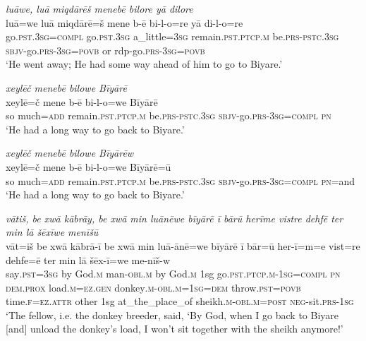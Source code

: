\ea \label{HB.64}
\textit{luāwe, luā miqdārēš menebē bilore yā dilore} \\ 
\gll luā=we luā miqdārē=š mene b-ē bi-l-o=re yā di-l-o=re \\ 
 go\textsc{.pst}\textsc{.3sg}\textsc{=\textsc{compl}} go\textsc{.pst}\textsc{.3sg} a\_little\textsc{=3sg} remain\textsc{.pst}\textsc{.ptcp}\textsc{.m} be\textsc{.prs}\textsc{-pstc}\textsc{.3sg} \textsc{sbjv-}go\textsc{.prs}\textsc{-3sg}\textsc{=\textsc{povb}} or rdp-go\textsc{.prs}\textsc{-3sg}\textsc{=\textsc{povb}} \\ 
\glt `He went away; He had some way ahead of him to go to Biyare.'
\z 
 
\ea \label{HB.65}
\textit{xeylēč menebē bilowe Bīyārē} \\ 
\gll xeylē=č mene b-ē bi-l-o=we Bīyārē \\ 
 so much\textsc{=add} remain\textsc{.pst}\textsc{.ptcp}\textsc{.m} be\textsc{.prs}\textsc{-pstc}\textsc{.3sg} \textsc{sbjv-}go\textsc{.prs}\textsc{-3sg}\textsc{=\textsc{compl}} \textsc{pn} \\ 
\glt `He had a long way to go back to Biyare.'
\z 
 
\ea \label{HB.66}
\textit{xeylēč menebē bilowe Bīyārēw} \\ 
\gll xeylē=č mene b-ē bi-l-o=we Bīyārē=ū \\ 
 so much\textsc{=add} remain\textsc{.pst}\textsc{.ptcp}\textsc{.m} be\textsc{.prs}\textsc{-pstc}\textsc{.3sg} \textsc{sbjv-}go\textsc{.prs}\textsc{-3sg}\textsc{=\textsc{compl}} \textsc{pn}=and \\ 
\glt `He had a long way to go back to Biyare.'
\z 
 
\ea \label{HB.67}
\textit{vātiš, be xwā kābrāy, be xwā min luānēwe bīyārē ī bārū herīme vistre dehfē ter min lā šēxīwe menīšū} \\ 
\gll vāt=iš be xwā kābrā-ī be xwā min luā-ānē=we bīyārē ī bār=ū her-ī=m=e vist=re dehfe=ē ter min lā šēx-ī=we me-nīš-w \\ 
 say\textsc{.pst}\textsc{=3sg} by God\textsc{.m} man\textsc{-obl}\textsc{.m} by God\textsc{.m} 1sg go\textsc{.pst}\textsc{.ptcp}\textsc{.m}\textsc{-1sg}\textsc{=\textsc{compl}} \textsc{pn} \textsc{dem.prox} load\textsc{.m}\textsc{=ez}\textsc{.gen} donkey\textsc{.m}\textsc{-obl}\textsc{.m}\textsc{=1sg}\textsc{=dem} throw\textsc{.pst}\textsc{=\textsc{povb}} time\textsc{\textsc{.f}}\textsc{=ez}.\textsc{attr} other 1sg at\_the\_place\_of sheikh\textsc{.m}\textsc{-obl}\textsc{.m}\textsc{=\textsc{post}} \textsc{neg-}sit\textsc{.prs}\textsc{-1sg} \\ 
\glt `The fellow, i.e. the donkey breeder, said, ‘By God, when I go back to Biyare [and] unload the donkey’s load, I won’t sit together with the sheikh anymore!'
\z 
 
